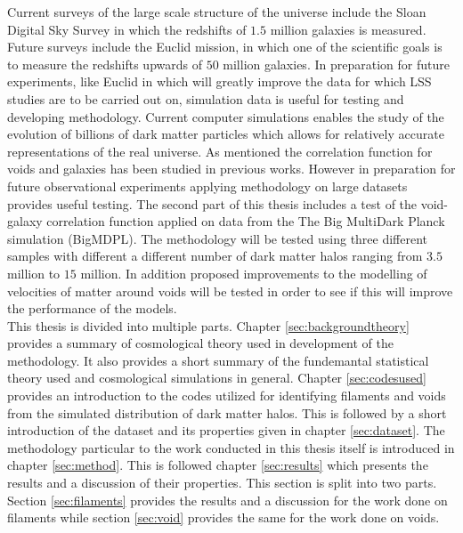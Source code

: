 Current surveys of the large scale structure of the universe include the Sloan Digital Sky Survey \cite{Eisenstein_2011} in which the redshifts of $1.5$ million galaxies is measured. Future surveys include the Euclid mission, in which one of the scientific goals is to measure the redshifts upwards of $50$ million galaxies\cite{eucliddefinition}. In preparation for future experiments, like Euclid in which will greatly improve the data for which LSS studies are to be carried out on, simulation data is useful for testing and developing methodology. Current computer simulations enables the study of the evolution of billions of dark matter particles\cite{Millennium}\cite{Multidark_dataset} which allows for relatively accurate representations of the real universe. As mentioned the correlation function for voids and galaxies has been studied in previous works. However in preparation for future observational experiments applying methodology on large datasets provides useful testing. The second part of this thesis includes a test of the void-galaxy correlation function applied on data from the The Big MultiDark Planck simulation (BigMDPL)\cite{Multidark_dataset}. The methodology will be tested using three different samples with different a different number of dark matter halos ranging from $3.5$ million to $15$ million. In addition proposed improvements to the modelling of velocities of matter around voids\cite{Achitouv_streaming} will be tested in order to see if this will improve the performance of the models.\\\indent
This thesis is divided into multiple parts. Chapter \ref{sec:backgroundtheory} provides a summary of cosmological theory used in development of the methodology. It also provides a short summary of the fundemantal statistical theory used and cosmological simulations in general. Chapter \ref{sec:codesused} provides an introduction to the codes utilized for identifying filaments and voids from the simulated distribution of dark matter halos. This is followed by a short introduction of the dataset and its properties given in chapter \ref{sec:dataset}. The methodology particular to the work conducted in this thesis itself is introduced in chapter \ref{sec:method}. This is followed chapter \ref{sec:results} which presents the results and a discussion of their properties. This section is split into two parts. Section \ref{sec:filaments} provides the results and a discussion for the work done on filaments while section \ref{sec:void} provides the same for the work done on voids. 